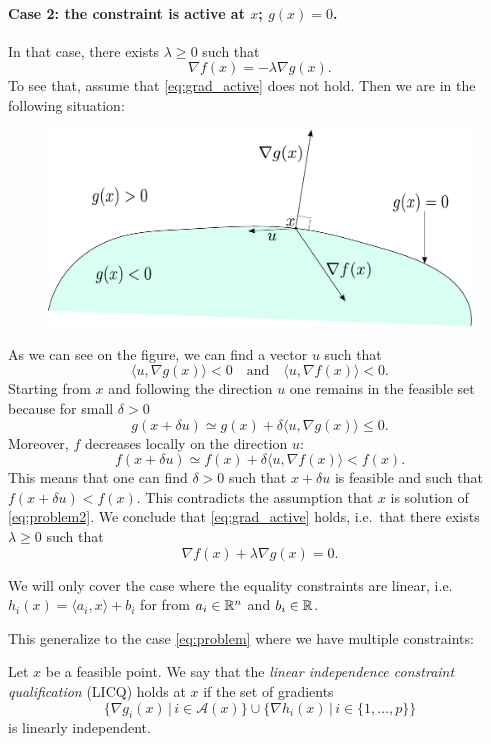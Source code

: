 \documentclass[11pt,nocut]{article}
\begin{document}
\paragraph{Case 2: the constraint is active at $x$; $g(x) = 0$.}
In that case, there exists $\lambda \geq 0$ such that 
\begin{equation}\label{eq:grad_active}
	\nabla f(x) = - \lambda \nabla g(x).
\end{equation}
To see that, assume that \eqref{eq:grad_active} does not hold. Then we are in the following situation:
\begin{figure}[h!]
	\begin{center}
		\includegraphics[width=0.8\linewidth]{figures/absurd.pdf}
	\end{center}
\end{figure}

As we can see on the figure, we can find a vector $u$ such that
$$
\langle u, \nabla g(x) \rangle < 0 
\quad \text{and} \quad
\langle u, \nabla f(x) \rangle < 0.
$$
Starting from $x$ and following the direction $u$ one remains in the feasible set because for small $\delta >0$
$$
g(x + \delta u) \simeq g(x) + \delta \langle u, \nabla g(x) \rangle \leq 0.
$$
Moreover, $f$ decreases locally on the direction $u$:
$$
f(x + \delta u) \simeq f(x) + \delta \langle u, \nabla f(x) \rangle < f(x).
$$
This means that one can find $\delta > 0$ such that $x + \delta u$ is feasible and such that $f(x + \delta u) < f(x)$. This contradicts the assumption that $x$ is solution of \eqref{eq:problem2}.
We conclude that \eqref{eq:grad_active} holds, i.e.\ that there exists $\lambda \geq 0$ such that
$$
\nabla f(x) + \lambda \nabla g(x) = 0.
$$

We will only cover the case where the equality constraints are linear, i.e. $h_i(x) = \langle a_i, x \rangle + b_i$ for from $a_i \in \mathbb{R}^n$ and $b_i \in \mathbb{R}$.

This generalize to the case \eqref{eq:problem} where we have multiple constraints:

\begin{definition}[LICQ]
	Let $x$ be a feasible point. We say that the \emph{linear independence constraint qualification} (LICQ) holds at $x$ if the set of gradients
	$$
	\big\{ \nabla g_i(x) \, \big| \, i \in \mathcal{A}(x) \big\}
	\cup
	\big\{ \nabla h_i(x) \, \big| \, i \in \{1, \dots, p\} \big\}
	$$
	is linearly independent.
\end{definition}
\end{document}

